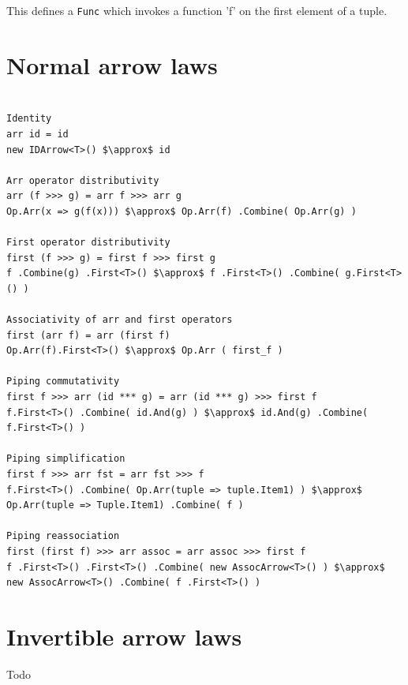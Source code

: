 \documentclass[12pt,twoside,notitlepage]{report}
\begin{document}
This defines a \texttt{Func} which invokes a function 'f' on the first element of a tuple.

\section{Normal arrow laws} \label{sec:simle_arrow_laws}

\begin{samepage}
\begin{lstlisting}[mathescape]

Identity
arr id = id
new IDArrow<T>() $\approx$ id

Arr operator distributivity
arr (f >>> g) = arr f >>> arr g
Op.Arr(x => g(f(x))) $\approx$ Op.Arr(f) .Combine( Op.Arr(g) )

First operator distributivity
first (f >>> g) = first f >>> first g
f .Combine(g) .First<T>() $\approx$ f .First<T>() .Combine( g.First<T>() )

Associativity of arr and first operators
first (arr f) = arr (first f)
Op.Arr(f).First<T>() $\approx$ Op.Arr ( first_f )

Piping commutativity
first f >>> arr (id *** g) = arr (id *** g) >>> first f
f.First<T>() .Combine( id.And(g) ) $\approx$ id.And(g) .Combine( f.First<T>() )

Piping simplification
first f >>> arr fst = arr fst >>> f
f.First<T>() .Combine( Op.Arr(tuple => tuple.Item1) ) $\approx$ Op.Arr(tuple => Tuple.Item1) .Combine( f )

Piping reassociation
first (first f) >>> arr assoc = arr assoc >>> first f
f .First<T>() .First<T>() .Combine( new AssocArrow<T>() ) $\approx$ new AssocArrow<T>() .Combine( f .First<T>() )

\end{lstlisting}
\end{samepage}

\section{Invertible arrow laws} \label{sec:invertible_arrow_laws}

Todo

\cleardoublepage
\end{document}

